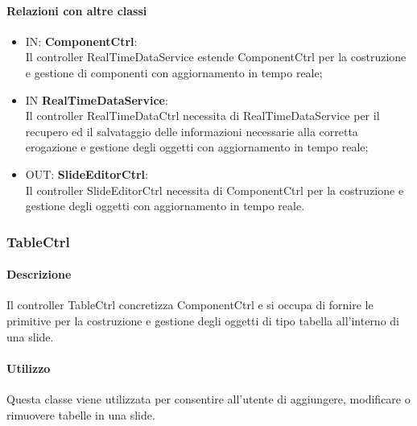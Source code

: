 	\paragraph{Relazioni con altre classi}
	\begin{itemize}
 	\item IN: \textbf{ComponentCtrl}:\\
	 	Il controller RealTimeDataService estende ComponentCtrl per la costruzione e gestione di componenti con aggiornamento in tempo reale;
	\item IN \textbf{RealTimeDataService}:\\
		Il controller RealTimeDataCtrl necessita di RealTimeDataService per il recupero ed il salvataggio delle informazioni necessarie alla corretta erogazione e gestione degli oggetti con aggiornamento in tempo reale;
	\item OUT: \textbf{SlideEditorCtrl}:\\
		Il controller SlideEditorCtrl necessita di ComponentCtrl per la costruzione e gestione degli oggetti con aggiornamento in tempo reale. 	
	\end{itemize}

\newpage
\subsubsection{TableCtrl}
   \paragraph{Descrizione}
	Il controller TableCtrl concretizza ComponentCtrl e si occupa di fornire le primitive per la costruzione e gestione degli oggetti di tipo tabella all'interno di una slide.
		
	\paragraph{Utilizzo}
	Questa classe viene utilizzata per consentire all'utente di aggiungere, modificare o rimuovere tabelle in una slide.
	

